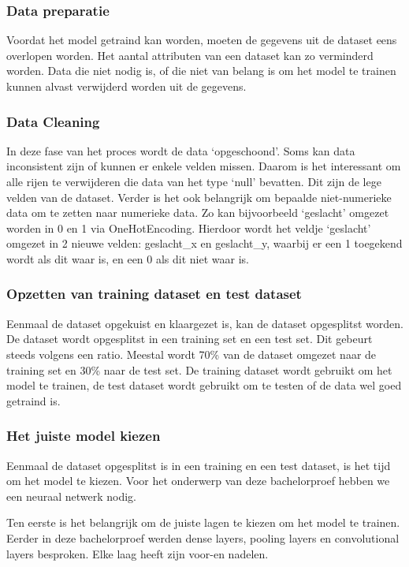 \subsubsection{Data preparatie}
\label{sec:datapreparatie}
Voordat het model getraind kan worden, moeten de gegevens uit de dataset eens overlopen worden. Het aantal attributen van een dataset kan zo verminderd worden. Data die niet nodig is, of die niet van belang is om het model te trainen kunnen alvast verwijderd worden uit de gegevens. 

\subsubsection{Data Cleaning}
\label{sec:datacleaning}
In deze fase van het proces wordt de data ‘opgeschoond’. Soms kan data inconsistent zijn of kunnen er enkele velden missen. Daarom is het interessant om alle rijen te verwijderen die data van het type ‘null’ bevatten. Dit zijn de lege velden van de dataset. Verder is het ook belangrijk om bepaalde niet-numerieke data om te zetten naar numerieke data. Zo kan bijvoorbeeld ‘geslacht’ omgezet worden in 0 en 1 via \gls{OneHotEncoding}. Hierdoor wordt het veldje ‘geslacht’ omgezet in 2 nieuwe velden: geslacht\_x en geslacht\_y, waarbij er een 1 toegekend wordt als dit waar is, en een 0 als dit niet waar is. 

\subsubsection{Opzetten van training dataset en test dataset}
\label{sec:opzetten}
Eenmaal de dataset opgekuist en klaargezet is, kan de dataset opgesplitst worden. De dataset wordt opgesplitst in een training set en een test set. Dit gebeurt steeds volgens een ratio. Meestal wordt 70\% van de dataset omgezet naar de training set en 30\% naar de test set. De training dataset wordt gebruikt om het model te trainen, de test dataset wordt gebruikt om te testen of de data wel goed getraind is. 

\subsubsection{Het juiste model kiezen}
\label{sec:model}
Eenmaal de dataset opgesplitst is in een training en een test dataset, is het tijd om het model te kiezen. Voor het onderwerp van deze bachelorproef hebben we een neuraal netwerk nodig. 

Ten eerste is het belangrijk om de juiste lagen te kiezen om het model te trainen. Eerder in deze bachelorproef werden dense layers, pooling layers en convolutional layers besproken. Elke laag heeft zijn voor-en nadelen. 

